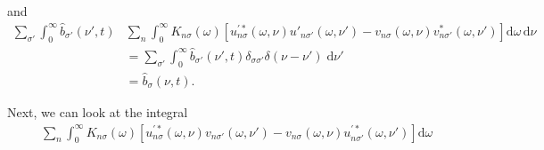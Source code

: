 and
\begin{equation}
\begin{split}
\sum_{\sigma'}\int_0^\infty\hat{b}_{\sigma'}(\nu',t)&\sum_n\int_0^\infty K_{n\sigma}(\omega)\left[u_{n\sigma}^{\prime*}(\omega,\nu)u'_{n\sigma'}(\omega,\nu') - v_{n\sigma}(\omega,\nu)v_{n\sigma'}^*(\omega,\nu')\right]\mathrm{d}\omega\,\mathrm{d}\nu\\
&= \sum_{\sigma'}\int_0^\infty\hat{b}_{\sigma'}(\nu',t)\delta_{\sigma\sigma'}\delta(\nu - \nu')\;\mathrm{d}\nu'\\
&= \hat{b}_\sigma(\nu,t).
\end{split}
\end{equation}

Next, we can look at the integral
\begin{equation}
\begin{split}
&\sum_n\int_0^\infty K_{n\sigma}(\omega)\left[u^{\prime*}_{n\sigma}(\omega,\nu)v_{n\sigma'}(\omega,\nu') - v_{n\sigma}(\omega,\nu)u^{\prime*}_{n\sigma'}(\omega,\nu')\right]\mathrm{d}\omega\\

\end{split}
\end{equation}
